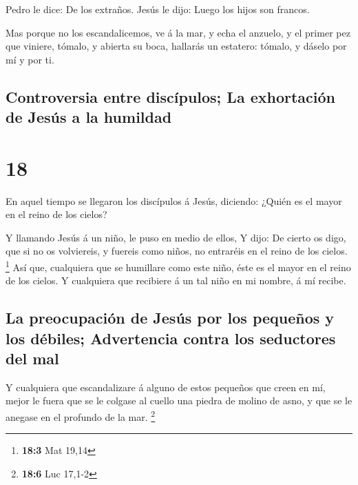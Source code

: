  Pedro le dice: De los extraños. Jesús le dijo: Luego los
hijos son francos.

 Mas porque no los escandalicemos, ve á la mar, y echa el
anzuelo, y el primer pez que viniere, tómalo, y abierta su boca,
hallarás un estatero: tómalo, y dáselo por mí y por ti.

\hypertarget{controversia-entre-discuxedpulos-la-exhortaciuxf3n-de-jesuxfas-a-la-humildad}{%
\subsection{Controversia entre discípulos; La exhortación de Jesús a la
humildad}\label{controversia-entre-discuxedpulos-la-exhortaciuxf3n-de-jesuxfas-a-la-humildad}}

\hypertarget{section-17}{%
\section{18}\label{section-17}}

 En aquel tiempo se llegaron los discípulos á Jesús,
diciendo: ¿Quién es el mayor en el reino de los cielos?

 Y llamando Jesús á un niño, le puso en medio de ellos,
 Y dijo: De cierto os digo, que si no os volviereis, y
fuereis como niños, no entraréis en el reino de los cielos. \footnote{\textbf{18:3}
  Mat 19,14}  Así que, cualquiera que se humillare como
este niño, éste es el mayor en el reino de los cielos.  Y
cualquiera que recibiere á un tal niño en mi nombre, á mí recibe.

\hypertarget{la-preocupaciuxf3n-de-jesuxfas-por-los-pequeuxf1os-y-los-duxe9biles-advertencia-contra-los-seductores-del-mal}{%
\subsection{La preocupación de Jesús por los pequeños y los débiles;
Advertencia contra los seductores del
mal}\label{la-preocupaciuxf3n-de-jesuxfas-por-los-pequeuxf1os-y-los-duxe9biles-advertencia-contra-los-seductores-del-mal}}

 Y cualquiera que escandalizare á alguno de estos pequeños
que creen en mí, mejor le fuera que se le colgase al cuello una piedra
de molino de asno, y que se le anegase en el profundo de la mar.
\footnote{\textbf{18:6} Luc 17,1-2}

